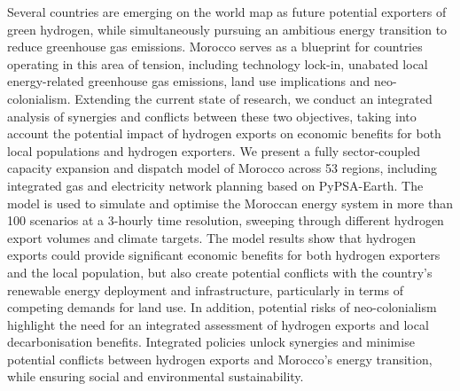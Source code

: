 Several countries are emerging on the world map as future potential exporters of green hydrogen, while simultaneously pursuing an ambitious energy transition to reduce greenhouse gas emissions. Morocco serves as a blueprint for countries operating in this area of tension, including technology lock-in, unabated local energy-related greenhouse gas emissions, land use implications and neo-colonialism. Extending the current state of research, we conduct an integrated analysis of synergies and conflicts between these two objectives, taking into account the potential impact of hydrogen exports on economic benefits for both local populations and hydrogen exporters. We present a fully sector-coupled capacity expansion and dispatch model of Morocco across 53 regions, including integrated gas and electricity network planning based on PyPSA-Earth. The model is used to simulate and optimise the Moroccan energy system in more than 100 scenarios at a 3-hourly time resolution, sweeping through different hydrogen export volumes and climate targets. The model results show that hydrogen exports could provide significant economic benefits for both hydrogen exporters and the local population, but also create potential conflicts with the country's renewable energy deployment and infrastructure, particularly in terms of competing demands for land use. In addition, potential risks of neo-colonialism highlight the need for an integrated assessment of hydrogen exports and local decarbonisation benefits. Integrated policies unlock synergies and minimise potential conflicts between hydrogen exports and Morocco's energy transition, while ensuring social and environmental sustainability.